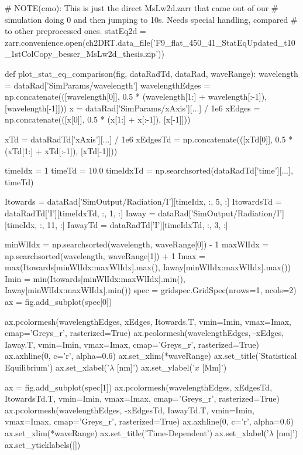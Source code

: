 \begin{pycode}[2DRT]
# NOTE(cmo): This is just the direct MsLw2d.zarr that came out of our
# simulation doing 0 and then jumping to 10s. Needs special handling, compared
# to other preprocessed ones.
statEq2d = zarr.convenience.open(ch2DRT.data_file('F9_flat_450_41_StatEqUpdated_t10_1stColCopy_besser_MsLw2d_thesis.zip'))

def plot_stat_eq_comparison(fig, dataRadTd, dataRad, waveRange):
    wavelength = dataRad['SimParams/wavelength']
    wavelengthEdges = np.concatenate(([wavelength[0]], 0.5 * (wavelength[1:] + wavelength[:-1]), [wavelength[-1]]))
    x = dataRad['SimParams/xAxis'][...] / 1e6
    xEdges = np.concatenate(([x[0]], 0.5 * (x[1:] + x[:-1]), [x[-1]]))

    xTd = dataRadTd['xAxis'][...] / 1e6
    xEdgesTd = np.concatenate(([xTd[0]], 0.5 * (xTd[1:] + xTd[:-1]), [xTd[-1]]))

    timeIdx = 1
    timeTd = 10.0
    timeIdxTd = np.searchsorted(dataRadTd['time'][...], timeTd)

    Itowards = dataRad['SimOutput/Radiation/I'][timeIdx, :, 5, :]
    ItowardsTd = dataRadTd['I'][timeIdxTd, :, 1, :]
    Iaway = dataRad['SimOutput/Radiation/I'][timeIdx, :, 11, :]
    IawayTd = dataRadTd['I'][timeIdxTd, :, 3, :]

    minWlIdx = np.searchsorted(wavelength, waveRange[0]) - 1
    maxWlIdx = np.searchsorted(wavelength, waveRange[1]) + 1
    Imax = max(Itowards[minWlIdx:maxWlIdx].max(), Iaway[minWlIdx:maxWlIdx].max())
    Imin = min(Itowards[minWlIdx:maxWlIdx].min(), Iaway[minWlIdx:maxWlIdx].min())
    spec = gridspec.GridSpec(nrows=1, ncols=2)
    ax = fig.add_subplot(spec[0])

    ax.pcolormesh(wavelengthEdges, xEdges, Itowards.T, vmin=Imin, vmax=Imax, cmap='Greys_r', rasterized=True)
    ax.pcolormesh(wavelengthEdges, -xEdges, Iaway.T, vmin=Imin, vmax=Imax, cmap='Greys_r', rasterized=True)
    ax.axhline(0, c='r', alpha=0.6)
    ax.set_xlim(*waveRange)
    ax.set_title('Statistical Equilibrium')
    ax.set_xlabel('$\lambda$ [nm]')
    ax.set_ylabel('$x$ [Mm]')

    ax = fig.add_subplot(spec[1])
    ax.pcolormesh(wavelengthEdges, xEdgesTd, ItowardsTd.T, vmin=Imin, vmax=Imax, cmap='Greys_r', rasterized=True)
    ax.pcolormesh(wavelengthEdges, -xEdgesTd, IawayTd.T, vmin=Imin, vmax=Imax, cmap='Greys_r', rasterized=True)
    ax.axhline(0, c='r', alpha=0.6)
    ax.set_xlim(*waveRange)
    ax.set_title('Time-Dependent')
    ax.set_xlabel('$\lambda$ [nm]')
    ax.set_yticklabels([])


\end{pycode}
